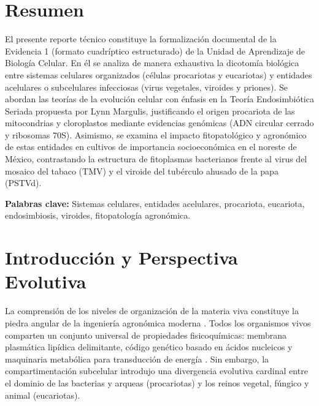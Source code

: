 \documentclass[spanish,letterpaper,oneside]{article}
\begin{document}
\hypersetup{pageanchor=false}
\begingroup
\fontsize{14}{17}\selectfont
\renewcommand{\Huge}{\fontsize{14}{17}\selectfont\bfseries}
\renewcommand{\large}{\fontsize{14}{17}\selectfont}
\templatePortrait
\clearpage
\endgroup
\hypersetup{pageanchor=true}
\templatePagecfg
\singlespacing
\setlength{\tabcolsep}{8pt}
\renewcommand{\arraystretch}{1.18}

\section*{Resumen}
El presente reporte técnico constituye la formalización documental de la Evidencia 1 (formato cuadríptico estructurado) de la Unidad de Aprendizaje de Biología Celular. En él se analiza de manera exhaustiva la dicotomía biológica entre sistemas celulares organizados (células procariotas y eucariotas) y entidades acelulares o subcelulares infecciosas (virus vegetales, viroides y priones). Se abordan las teorías de la evolución celular con énfasis en la Teoría Endosimbiótica Seriada propuesta por Lynn Margulis, justificando el origen procariota de las mitocondrias y cloroplastos mediante evidencias genómicas (ADN circular cerrado y ribosomas 70S). Asimismo, se examina el impacto fitopatológico y agronómico de estas entidades en cultivos de importancia socioeconómica en el noreste de México, contrastando la estructura de fitoplasmas bacterianos frente al virus del mosaico del tabaco (TMV) y el viroide del tubérculo ahusado de la papa (PSTVd).

\vspace{0.4cm}
\noindent\textbf{Palabras clave:} Sistemas celulares, entidades acelulares, procariota, eucariota, endosimbiosis, viroides, fitopatología agronómica.

\section{Introducción y Perspectiva Evolutiva}
La comprensión de los niveles de organización de la materia viva constituye la piedra angular de la ingeniería agronómica moderna \parencite{alberts2015}. Todos los organismos vivos comparten un conjunto universal de propiedades fisicoquímicas: membrana plasmática lipídica delimitante, código genético basado en ácidos nucleicos y maquinaria metabólica para transducción de energía \parencite{lodish2016}. Sin embargo, la compartimentación subcelular introdujo una divergencia evolutiva cardinal entre el dominio de las bacterias y arqueas (procariotas) y los reinos vegetal, fúngico y animal (eucariotas).
\end{document}

